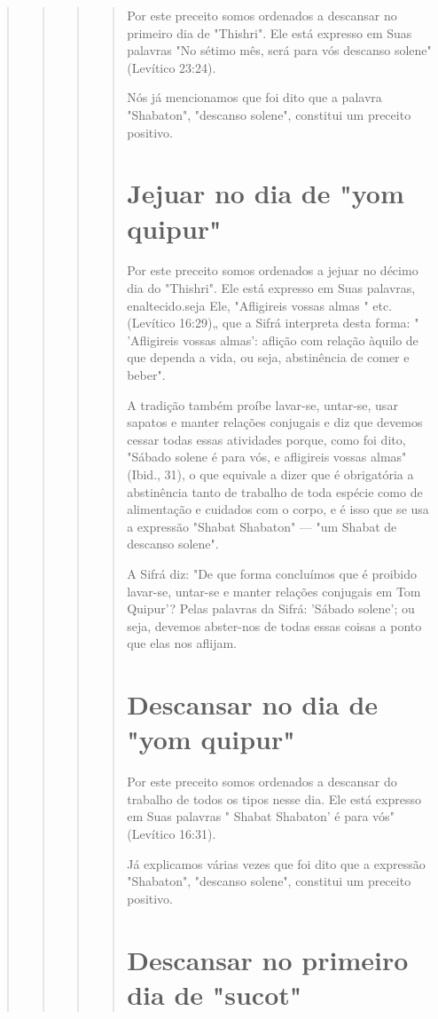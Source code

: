 \begin{quote}
\begin{quote}
\begin{quote}
\begin{quote}
Por este preceito somos ordenados a descansar no primeiro dia de
"Thishri". Ele está expresso em Suas palavras "No sétimo mês, será para
vós descanso solene" (Levítico 23:24).

Nós já mencionamos que foi dito que a palavra "Shabaton", "des­canso
solene", constitui um preceito positivo.

\section{Jejuar no dia de "yom quipur"}

Por este preceito somos ordenados a jejuar no décimo dia do "This­hri".
Ele está expresso em Suas palavras, enaltecido.seja
Ele, "Afligireis vossas almas " etc. (Levítico 16:29)„ que a Sifrá
interpreta desta forma: " 'Afligireis vossas 
almas': aflição com relação àquilo de que dependa a vida, ou seja,
abstinên­cia de comer e beber".

A tradição também proíbe lavar-se, untar-se, usar sapatos e manter
relações conjugais e diz que devemos cessar todas essas atividades
porque, co­mo foi dito, "Sábado solene é para vós, e afligireis vossas
almas" (Ibid., 31), o que equivale a dizer que é obrigatória a
abstinência tanto de trabalho de toda espécie como de alimentação e
cuidados com o corpo, e é isso que se usa a expressão "Shabat Shabaton"
--- "um Shabat de descanso solene".

A Sifrá diz: "De que forma concluímos que é proibido lavar-se, untar-se
e manter relações conjugais em Tom Quipur'? Pelas palavras da Sifrá:
'Sába­do solene'; ou seja, devemos abster-nos de todas essas coisas a
ponto que elas nos aflijam.

\section{Descansar no dia de "yom quipur"}

Por este preceito somos ordenados a descansar do trabalho de to­dos os
tipos nesse dia. Ele está expresso em Suas palavras " Shabat Shabaton' é
para vós" (Levítico 16:31).

Já explicamos várias vezes que foi dito que a expressão "Shabaton",
"descanso solene", constitui um preceito positivo.

\section{Descansar no primeiro dia de "sucot"}


\end{quote}
\end{quote}
\end{quote}
\end{quote}
